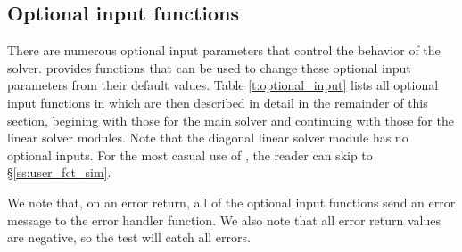 \subsection{Optional input functions}\label{ss:optional_input}

There are numerous optional input parameters that control the behavior
of the {\cvodes} solver.  {\cvodes} provides functions that can be used to change
these optional input parameters from their default values. 
Table \ref{t:optional_input} lists all optional input functions in {\cvodes} which 
are then described in detail in the remainder of this section, begining with those
for the main {\cvodes} solver and continuing with those for the linear solver
modules. Note that the diagonal linear solver module has no optional inputs.
For the most casual use of {\cvodes}, the reader can skip to \S\ref{ss:user_fct_sim}.

We note that, on an error return, all of the optional input functions send an
error message to the error handler function. 
We also note that all error return values are negative, so the test 
will catch all errors.

